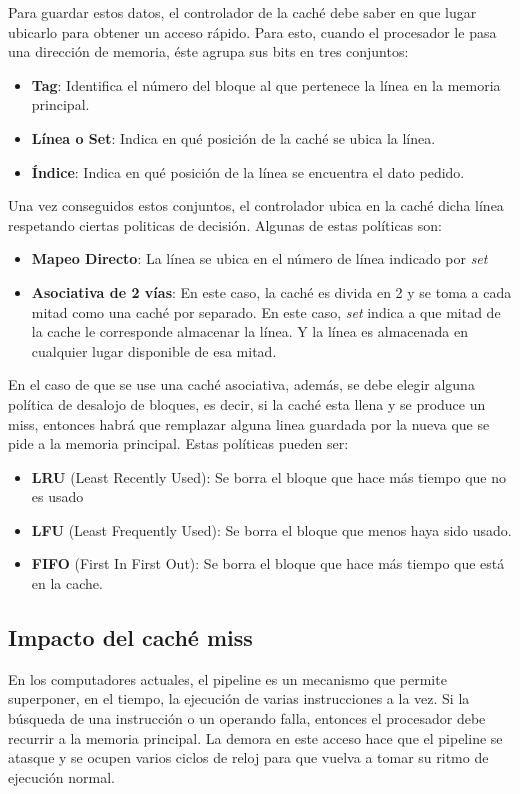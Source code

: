 Para guardar estos datos, el controlador de la caché debe saber en que lugar ubicarlo para obtener un acceso rápido. Para esto, cuando el procesador le pasa una dirección de memoria, éste agrupa sus bits en tres conjuntos:
\begin{itemize}
	\item\textbf{Tag}: Identifica el número del bloque al que pertenece la línea en la memoria principal.
	\item\textbf{Línea o Set}: Indica en qué posición de la caché se ubica la línea.
	\item\textbf{Índice}: Indica en qué posición de la línea se encuentra el dato pedido.
\end{itemize}
Una vez conseguidos estos conjuntos, el controlador ubica en la caché dicha línea respetando ciertas politicas de decisión. Algunas de estas políticas son:
\begin{itemize}
	\item\textbf{Mapeo Directo}: La línea se ubica en el número de línea indicado por \textit{set}
	\item\textbf{Asociativa de 2 vías}: En este caso, la caché es divida en 2 y se toma a cada mitad como una caché por separado. En este caso, \textit{set} indica a que mitad de la cache le corresponde almacenar la línea. Y la línea es almacenada en cualquier lugar disponible de esa mitad.
\end{itemize}

En el caso de que se use una caché asociativa, además, se debe elegir alguna política de desalojo de bloques, es decir, si la caché esta llena y se produce un miss, entonces habrá que remplazar alguna linea guardada por la nueva que se pide a la memoria principal. Estas políticas pueden ser:
\begin{itemize}
	\item\textbf{LRU} (Least Recently Used): Se borra el bloque que hace más tiempo que no es usado
	\item\textbf{LFU} (Least Frequently Used): Se borra el bloque que menos haya sido usado.
	\item\textbf{FIFO} (First In First Out): Se borra el bloque que hace más tiempo que está en la cache.
\end{itemize}

\subsection{Impacto del caché miss}
En los computadores actuales, el pipeline es un mecanismo que permite superponer, en el tiempo, la ejecución de varias instrucciones a la vez. Si la búsqueda de una instrucción o un operando falla, entonces el procesador debe recurrir a la memoria principal. La demora en este acceso hace que el pipeline se atasque y se ocupen varios ciclos de reloj para que vuelva a tomar su ritmo de ejecución normal.

